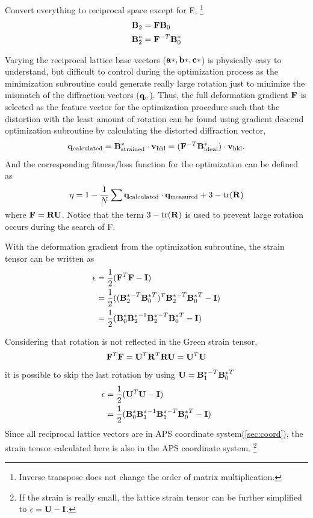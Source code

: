 \documentclass[12pt]{scrartcl}
\begin{document}
\begin{enumerate}
Convert everything to reciprocal space except for \tnsr F,
\footnote{Inverse transpose does not change the order of matrix multiplication.}
\begin{align*}
	\mathbf{B}_2 &= \mathbf{F} \mathbf{B}_0 \\
	\mathbf{B}^*_2 &= \mathbf{F}^{-T} \mathbf{B}_0^*
\end{align*}

Varying the reciprocal lattice base vectors ($\mathbf{a}*, \mathbf{b}*, \mathbf{c}*$) is physically easy to understand, but difficult to control during the optimization process as the minimization subroutine could generate really large rotation just to minimize the mismatch of the diffraction vectors ($\mathbf{q}_v$). 
Thus, the full deformation gradient $\mathbf{F}$ is selected as the feature vector for the optimization procedure such that the distortion with the least amount of rotation can be found using gradient descend optimization subroutine by calculating the distorted diffraction vector,
\[
	 \mathbf{q}_\text{calculated} 
	 = \mathbf{B}^*_\text{strained} \cdot \mathbf{v}_\text{hkl}
	 = (\mathbf{F}^{-T} \mathbf{B}^*_\text{ideal}) \cdot \mathbf{v}_\text{hkl}.
\]
And the corresponding fitness/loss function for the optimization can be defined as 
\[
	\eta = 1 - \dfrac{1}{N} \sum \mathbf{q}_\text{calculated} \cdot \mathbf{q}_\text{measured} + 3 - \text{tr}(\mathbf{R})
\]
where $\mathbf{F} = \mathbf{R} \mathbf{U}$.
Notice that the term $3 - \text{tr}(\mathbf{R})$ is used to prevent large rotation occurs during the search of \tnsr F.

With the deformation gradient from the optimization subroutine, the strain tensor can be written as
\begin{align*}
	\epsilon &= \dfrac{1}{2} (\mathbf{F}^T\mathbf{F} - \mathbf{I}) \\
	              &= \dfrac{1}{2} ( ({\mathbf{B}_2^*}^{-T} {\mathbf{B}_0^*}^T)^T{\mathbf{B}_2^*}^{-T} {\mathbf{B}_0^*}^T - \mathbf{I}) \\
	              &= \dfrac{1}{2} ( \mathbf{B}_0^* {\mathbf{B}_2^*}^{-1} {\mathbf{B}_2^*}^{-T} {\mathbf{B}_0^*}^T  - \mathbf{I})
\end{align*}

Considering that rotation is not reflected in the Green strain tensor,
\[
	\mathbf{F}^T \mathbf{F} = \mathbf{U}^T \mathbf{R}^T \mathbf{R} \mathbf{U} = \mathbf{U}^T \mathbf{U}
\]
it is possible to skip the last rotation by using $\mathbf{U} =  {\mathbf{B}_1^*}^{-T} {\mathbf{B}_0^*}^T$
\begin{align*}
	\epsilon &=  \dfrac{1}{2} (\mathbf{U}^T\mathbf{U} - \mathbf{I}) \\
	              &=  \dfrac{1}{2} ( \mathbf{B}_0^* {\mathbf{B}_1^*}^{-1} {\mathbf{B}_1^*}^{-T} {\mathbf{B}_0^*}^T  - \mathbf{I})
\end{align*}
Since all reciprocal lattice vectors are in APS coordinate system(\cref{sec:coord}), the strain tensor calculated here is also in the APS coordinate system.
\footnote{If the strain is really small, the lattice strain tensor can be further simplified to $\epsilon = \mathbf{U} - \mathbf{I}$.} 


\end{enumerate}
\end{document}

